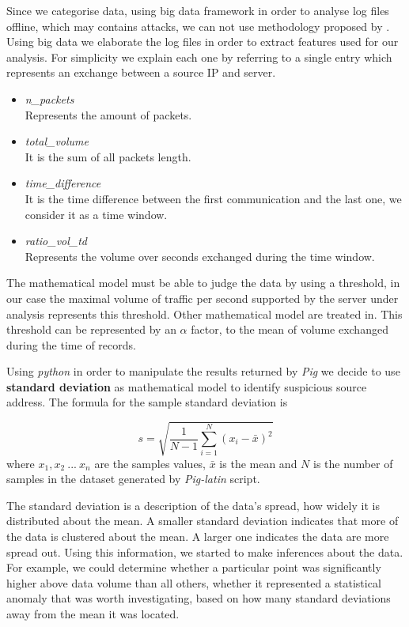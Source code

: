 Since we categorise data, using big data framework in order to analyse log files offline, which may contains attacks, we can not use methodology proposed by \cite{detection_by_path_analaysis}. Using big data we elaborate the log files in order to extract features used for our analysis. For simplicity we explain each one by referring to a single entry which represents an exchange between a source IP and server.

\begin{itemize}
	\item \textit{n\_packets} \\ Represents the amount of packets.
	\item \textit{total\_volume} \\ It is the sum of all packets length.
	\item \textit{time\_difference} \\ It is the time difference between the first communication and the last one, we consider it as a time window.
	\item \textit{ratio\_vol\_td} \\ Represents the volume over seconds exchanged during the time window.
\end{itemize}

The mathematical model must be able to judge the data by using a threshold, in our case the maximal volume of traffic per second supported by the server under analysis represents this threshold. Other mathematical model are treated in\cite{detection_by_path_analaysis}. 
This threshold can be represented by an $\alpha$ factor, to the mean of volume exchanged during the time of records.

Using \textit{python} in order to manipulate the results returned by \textit{Pig} we decide to use \textbf{standard deviation} as mathematical model to identify suspicious source address.
The formula for the sample standard deviation is

\begin{equation}
\label{eq:standard_dev}
	s = \sqrt{\frac{1}{N-1}\sum_{i=1}^N(x_i - \bar{x})^2}
\end{equation}
where $x_1, x_2\ ...\ x_n$ are the samples values, $\bar{x}$ is the mean and $N$ is the number of samples in the dataset generated by \textit{Pig-latin} script.

The standard deviation is a description of the data's spread, how widely it is distributed about the mean.  
A smaller standard deviation indicates that more of the data is clustered about the mean.  
A larger one indicates the data are more spread out.
Using this information, we started to make inferences about the data.  
For example, we could determine whether a particular point was significantly higher above data volume than all others,  whether it represented a statistical anomaly that was worth investigating, based on how many standard deviations away from the mean it was located.

